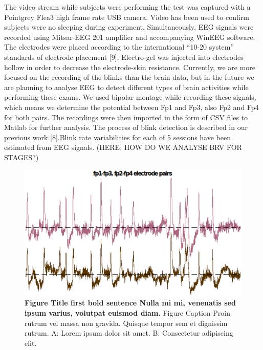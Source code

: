 \documentclass[10pt,letterpaper]{article}
\begin{document}
The video stream while subjects were performing the test was captured with a Pointgrey Flea3 high frame rate USB camera. Video has been used to confirm subjects were no sleeping during experiment. Simultaneously, EEG signals were recorded using Mitsar-EEG 201 amplifier and accompanying WinEEG software. The electrodes were placed according to the international “10-20 system” standards of electrode placement [9]. Electro-gel was injected into electrodes hollow in order to decrease the electrode-skin resistance. Currently, we are more focused on the recording of the blinks than the brain data, but in the future we are planning to analyse EEG to detect different types of brain activities while performing these exams. We used bipolar montage while recording these signals, which means we determine the potential between Fp1 and Fp3, also Fp2 and Fp4 for both pairs. The recordings were then imported in the form of CSV files to Matlab for further analysis. The process of blink detection is described in our previous work [8].Blink rate variabilities for each of 5 sessions have been estimated from EEG signals.
(HERE: HOW DO WE ANALYSE BRV FOR STAGES?)


\begin{figure}[h]
\includegraphics[width=5.0in]{img/signals.eps}
\caption{{\bf Figure Title first bold sentence Nulla mi mi, venenatis sed ipsum varius, volutpat euismod diam.}
Figure Caption Proin rutrum vel massa non gravida. Quisque tempor sem et dignissim rutrum. A: Lorem ipsum dolor sit amet. B: Consectetur adipiscing elit.}
\label{fig1}
\end{figure}
\end{document}
